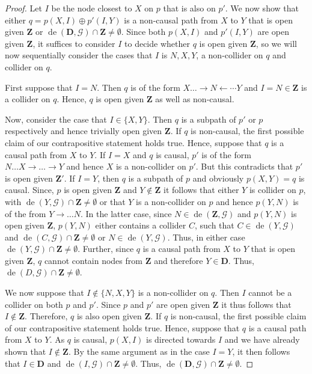 \documentclass[11pt,a4paper]{article}
\theoremstyle{definition}
\theoremstyle{remark}
\DeclareMathOperator{\de}{de}
\newcommand{\g}[1][G]{\mathcal{#1}}
\begin{document}
\begin{proof}
	Let $I$ be the node closest to $X$ on $p$ that is also on $p'$. We now show that either $q=p(X,I) \oplus p'(I,Y)$ is a non-causal path from $X$ to $Y$ that is open given $\mathbf{Z}$ or $\de(\mathbf{D},\g) \cap \mathbf{Z} \neq \emptyset$.
	Since both $p(X,I)$ and $p'(I,Y)$ are open given $\mathbf{Z}$, it suffices to consider $I$ to decide whether $q$ is open given $\mathbf{Z}$, so we will now sequentially consider the cases that $I $ is $N,X,Y$, a non-collider on $q$ and collider on $q$.
	
	First suppose that $I=N$. Then $q$ is of the form $X \dots \rightarrow N \leftarrow \cdots Y$ and $I=N \in \mathbf{Z}$ is a collider on $q$. Hence, $q$ is open given $\mathbf{Z}$ as well as non-causal.
	
	
	Now, consider the case that $I\in \{X,Y\}$. Then $q$ is a subpath of $p'$ or $p$ respectively and hence trivially open given $\mathbf{Z}$.  If $q$ is non-causal, the first possible claim of our contrapositive statement holds true. 
	Hence, suppose that $q$ is a causal path from $X$ to $Y$. If $I=X$ and $q$ is causal, $p'$ is of the form $N \dots X \rightarrow \dots \rightarrow Y$ and hence $X$ is a non-collider on $p'$. But this contradicts that $p'$ is open given $\mathbf{Z'}$. If $I=Y$, then $q$ is a subpath of $p$ and obviously $p(X,Y)=q$ is causal. Since, $p$ is open given $\mathbf{Z}$ and $Y\notin \mathbf{Z}$ it follows that either $Y$ is collider on $p$, with $\de(Y,\g) \cap \mathbf{Z} \neq \emptyset$ or that $Y$ is a non-collider on $p$ and hence $p(Y,N)$ is of the from $Y \rightarrow \dots N$. In the latter case, since $N \in \de(\mathbf{Z},\g)$ and $p(Y,N)$ is open given $\mathbf{Z}$, $p(Y,N)$ either contains a collider $C$, such that $C \in \de(Y,\g)$ and $\de(C,\g) \cap \mathbf{Z} \neq \emptyset$ or $N \in \de(Y,\g)$. Thus, in either case $\de(Y,\g) \cap \mathbf{Z} \neq \emptyset$.
	Further, since $q$ is a causal path from $X$ to $Y$ that is open given $\mathbf{Z}$, $q$ cannot contain nodes from $\mathbf{Z}$ and therefore $Y \in \mathbf{D}$. Thus, $\de(D,\g) \cap \mathbf{Z} \neq \emptyset$. 
	
	 We now suppose that $I \notin \{N,X,Y\}$ is a non-collider on $q$. Then $I$ cannot be a collider on both $p$ and $p'$. Since $p$ and $p'$ are open given $\mathbf{Z}$ it thus follows that $I \notin \mathbf{Z}$. Therefore, $q$ is also open given $\mathbf{Z}$. 
	 If $q$ is non-causal, the first possible claim of our contrapositive statement holds true. Hence, suppose that $q$ is a causal path from $X$ to $Y$.  
	 As $q$ is causal, $ p(X,I)$ is directed towards $I$ and we have already shown that $I\notin \mathbf{Z}$.
	 By the same argument as in the case $I=Y$, it then follows that $I \in \mathbf{D}$ and $\de(I,\g) \cap \mathbf{Z} \neq \emptyset$. Thus, $\de(\mathbf{D},\g) \cap \mathbf{Z} \neq \emptyset$. 
	 

\end{proof}
\end{document}
